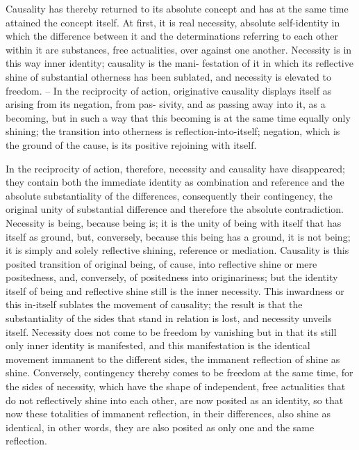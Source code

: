 Causality has thereby returned to its absolute concept and has at the
same time attained the concept itself. At first, it is real necessity, absolute
self-identity in which the difference between it and the determinations
referring to each other within it are substances, free actualities, over against
one another. Necessity is in this way inner identity; causality is the mani-
festation of it in which its reflective shine of substantial otherness has been
sublated, and necessity is elevated to freedom. – In the reciprocity of action,
originative causality displays itself as arising from its negation, from pas-
sivity, and as passing away into it, as a becoming, but in such a way that
this becoming is at the same time equally only shining; the transition into
otherness is reflection-into-itself; negation, which is the ground of the cause,
is its positive rejoining with itself.

In the reciprocity of action, therefore,
necessity and causality have disappeared;
they contain both the immediate identity
as combination and reference
and the absolute substantiality of the differences,
consequently their contingency,
the original unity of substantial difference
and therefore the absolute contradiction.
Necessity is being, because being is;
it is the unity of being with itself that has itself as ground,
but, conversely, because this being has a ground, it is not being;
it is simply and solely reflective shining, reference or mediation.
Causality is this posited transition of original being,
of cause, into reflective shine or mere positedness,
and, conversely, of positedness into originariness;
but the identity itself of being and reflective shine
still is the inner necessity.
This inwardness or this in-itself sublates
the movement of causality;
the result is that the substantiality of the sides
that stand in relation is lost, and necessity unveils itself.
Necessity does not come to be freedom by vanishing
but in that its still only inner identity is manifested,
and this manifestation is the identical movement immanent to
the different sides,
the immanent reflection of shine as shine.
Conversely, contingency thereby comes to be freedom at the same time,
for the sides of necessity, which have the shape of
independent, free actualities that do not reflectively shine into each other,
are now posited as an identity, so that now these totalities
of immanent reflection, in their differences, also shine as identical,
in other words, they are also posited as only one and the same reflection.

